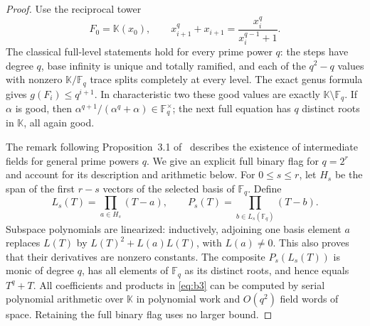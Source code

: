 \documentclass[11pt,letterpaper]{article}
\numberwithin{equation}{section}
\begin{document}
\begin{proof}
Use the reciprocal tower
\begin{equation}
F_0=\mathbb K(x_0),\qquad
 x_{i+1}^q+x_{i+1}=\frac{x_i^q}{x_i^{q-1}+1}.
\label{eq:b2}
\end{equation}
The classical full-level statements \cite[Lemmas~5.2 and~5.4]{GarciaStichtenoth2007ExplicitTowers} hold for every prime power $q$: the steps have degree $q$, base infinity is unique and totally ramified, and each of the $q^2-q$ values with nonzero $\mathbb K/\mathbb F_q$ trace splits completely at every level.
The exact genus formula \cite[Proposition~1.1(iii)]{PellikaanStichtenothTorres1998Semigroups} gives $g(F_i)\le q^{i+1}$.
In characteristic two these good values are exactly $\mathbb K\setminus\mathbb F_q$.
If $\alpha$ is good, then $\alpha^{q+1}/(\alpha^q+\alpha)\in\mathbb F_q^\times$; the next full equation has $q$ distinct roots in $\mathbb K$, all again good.

The remark following Proposition~3.1 of~\cite{BP14} describes the existence of intermediate fields for general prime powers $q$.
We give an explicit full binary flag for $q=2^r$ and account for its description and arithmetic below.
For $0\le s\le r$, let $H_s$ be the span of the first $r-s$ vectors of the selected basis of $\mathbb F_q$.
Define
\begin{equation}
L_s(T)=\prod_{a\in H_s}(T-a),\qquad
 P_s(T)=\prod_{b\in L_s(\mathbb F_q)}(T-b).
\label{eq:b3}
\end{equation}
Subspace polynomials are linearized: inductively, adjoining one basis element $a$ replaces $L(T)$ by $L(T)^2+L(a)L(T)$, with $L(a)\ne0$.
This also proves that their derivatives are nonzero constants.
The composite $P_s(L_s(T))$ is monic of degree $q$, has all elements of $\mathbb F_q$ as its distinct roots, and hence equals $T^q+T$.
All coefficients and products in \eqref{eq:b3} can be computed by serial polynomial arithmetic over $\mathbb K$ in polynomial work and $O(q^2)$ field words of space.
Retaining the full binary flag uses no larger bound.


\end{proof}
\end{document}
